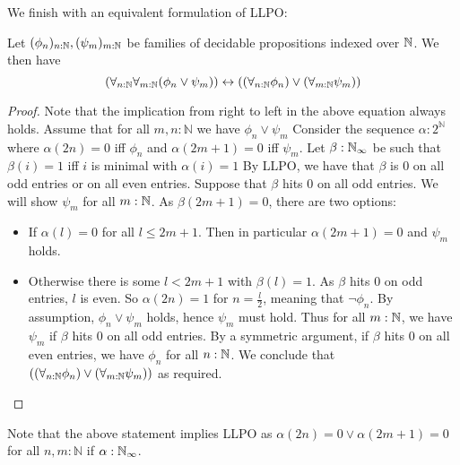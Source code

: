 We finish with an equivalent formulation of LLPO:

\begin{lemma}\label{corAlternativeLLPO}
  Let $(\phi_n)_{n:\mathbb{N}}, (\psi_m)_{m:\mathbb{N}}$ be families of decidable propositions indexed over $\mathbb{N}$.
  We then have 
  \begin{equation}
    (\forall_{n:\mathbb{N}} \forall_{m:\mathbb{N}} (\phi_n \vee \psi_m) )
    \leftrightarrow
    ((\forall_{n:\mathbb{N}} \phi_n) \vee (\forall_{m:\mathbb{N}} \psi_m) )
  \end{equation}
\end{lemma}

\begin{proof}
  Note that the implication from right to left in the above equation always holds.
  Assume that for all $m,n:\mathbb N$ we have $\phi_n\vee \psi_m$ 
  Consider the sequence $\alpha:2^\mathbb N$ where $\alpha(2n) = 0$ iff $\phi_n$ and 
  $\alpha(2m+1) = 0$ iff $\psi_m$. 
  Let $\beta:\mathbb{N}_{\infty}$ be such that $\beta(i) = 1$ iff $i$ is minimal with $\alpha(i) = 1$
  By LLPO, we have that 
  $\beta$ is $0$ on all odd entries or on all even entries. 
  Suppose that $\beta$ hits $0$ on all odd entries. 
  We will show $\psi_m$ for all $m:\mathbb{N}$. 
  As $\beta(2m+1) = 0$, there are two options:
  \begin{itemize}
    	\item If $\alpha(l)=0$ for all $l\leq 2m+1$. Then in particular $\alpha(2m+1)=0$ and $\psi_m$ holds.
	\item Otherwise there is some $l<2m+1$ with $\beta(l) = 1$. 
  As $\beta$ hits $0$ on odd entries, $l$ is even. 
  So $\alpha(2n) = 1$ for $n = \frac{l}2$, meaning that $\neg \phi_n$. 
  By assumption, $\phi_n \vee \psi_m$ holds, hence $\psi_m$ must hold. 
  Thus for all $m:\mathbb{N}$, we have $\psi_m$ if $\beta$ hits $0$ on all odd entries. 
  By a symmetric argument, if $\beta$ hits $0$ on all even entries, we have $\phi_n$ for all $n:\mathbb{N}$. 
  We conclude that 
  $((\forall_{n:\mathbb{N}} \phi_n) \vee (\forall_{m:\mathbb{N}} \psi_m) )$ 
  as required. 
  \end{itemize}
\end{proof}

\begin{remark}
Note that the above statement implies LLPO as $\alpha(2n) =0 \vee \alpha(2m+1) =0$ for all $n,m:\mathbb N$ if $\alpha:\mathbb{N}_{\infty}$. 
\end{remark}
